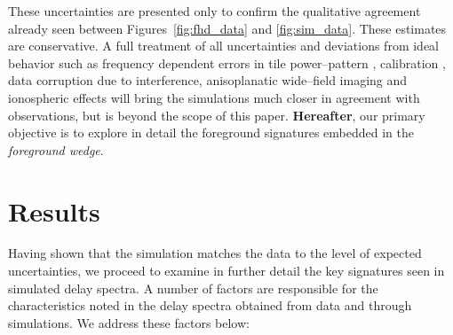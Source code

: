 \documentclass[preprint2,iop,numberedappendix]{emulateapj}
\begin{document}
These uncertainties are presented only to confirm the qualitative agreement already seen between Figures~\ref{fig:fhd_data} and \ref{fig:sim_data}. These estimates are conservative. A full treatment of all uncertainties and deviations from ideal behavior such as frequency dependent errors in tile power--pattern \citep{ber14}, calibration \citep{dat10}, data corruption due to interference, anisoplanatic wide--field imaging and ionospheric effects \citep{int09} will bring the simulations much closer in agreement with observations, but is beyond the scope of this paper. {\bf Hereafter}, our primary objective is to explore in detail the foreground signatures embedded in the {\it foreground wedge}.

\section{Results}\label{sec:delay-spectrum-analysis}

Having shown that the simulation matches the data to the level of expected uncertainties, we proceed to examine in further detail the key signatures seen in simulated delay spectra. A number of factors are responsible for the characteristics noted in the delay spectra obtained from data and through simulations. We address these factors below: 
\end{document}
